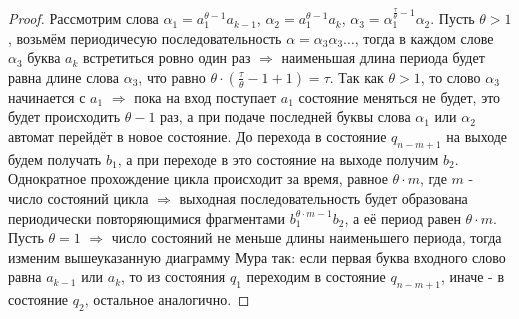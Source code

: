 \documentclass[a4paper, 12pt]{article}
\theoremstyle{definition}
\theoremstyle{plain}
\theoremstyle{remark}
\begin{document}
\begin{proof}
    Рассмотрим слова $\alpha_1=a_1^{\theta-1}a_{k-1}$, $\alpha_2=a_1^{\theta-1}a_k$, $\alpha_3=\alpha_1^{\frac{\tau}{\theta}-1}\alpha_2$. Пусть $\theta>1$, возьмём периодичесую последовательность $\alpha=\alpha_3\alpha_3\ldots$, тогда в каждом слове $\alpha_3$ буква $a_k$ встретиться ровно один раз $\Longrightarrow$ наименьшая длина периода будет равна длине слова $\alpha_3$, что равно $\theta\cdot(\frac{\tau}{\theta}-1+1)=\tau$. Так как $\theta>1$, то слово $\alpha_3$ начинается с $a_1$ $\Longrightarrow$ пока на вход поступает $a_1$ состояние меняться не будет, это будет происходить $\theta-1$ раз, а при подаче последней буквы слова $\alpha_1$ или $\alpha_2$ автомат перейдёт в новое состояние. До перехода в состояние $q_{n-m+1}$ на выходе будем получать $b_1$, а при переходе в это состояние на выходе получим $b_2$. Однократное прохождение цикла происходит за время, равное $\theta\cdot m$, где $m$ - число состояний цикла $\Longrightarrow$ выходная последовательность будет образована периодически повторяющимися фрагментами $b_1^{\theta\cdot m-1}b_2$, а её период равен $\theta\cdot m$.\\
    Пусть $\theta=1$ $\Longrightarrow$ число состояний не меньше длины наименьшего периода, тогда изменим вышеуказанную диаграмму Мура так: если первая буква входного слово равна $a_{k-1}$ или $a_k$, то из состояния $q_1$ переходим в состояние $q_{n-m+1}$, иначе - в состояние $q_2$, остальное аналогично.
  \end{proof}
\end{document}
